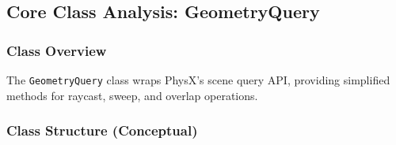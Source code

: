 \subsection{Core Class Analysis: GeometryQuery}

\subsubsection{Class Overview}

The \texttt{GeometryQuery} class wraps PhysX's scene query API, providing simplified methods for raycast, sweep, and overlap operations.

\subsubsection{Class Structure (Conceptual)}


